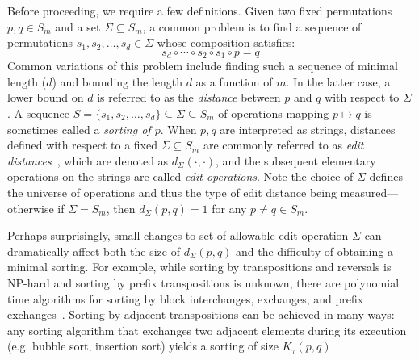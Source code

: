 \documentclass[sn-mathphys]{sn-jnl}
\begin{document}
Before proceeding, we require a few definitions. Given two fixed permutations $p, q \in S_m$ and a set $\Sigma \subseteq S_m$,  a common  problem is to find a sequence of permutations $s_1, s_2, \dots, s_d \in \Sigma$ whose composition satisfies:
	\begin{equation}\label{eq:sorting}
		s_d \circ \cdots \circ s_2 \circ s_1 \circ p = q
	\end{equation}
Common variations of this problem include finding such a sequence of minimal length ($d$) and bounding the length $d$ as a function of $m$. In the latter case, a lower bound on $d$ is referred to as the \emph{distance} between $p$ and $q$ with respect to $\Sigma$. 
A sequence $S = \{s_1, s_2, \dots, s_d\} \subseteq \Sigma \subseteq S_m$ of operations mapping $p \mapsto q$ is sometimes called a \emph{sorting of $p$}. 
When $p, q$ are interpreted as strings, distances defined with respect to a fixed $\Sigma \subseteq S_m$ are commonly referred to as \emph{edit distances}~\cite{bergroth2000survey}, which are denoted as $d_\Sigma(\cdot, \cdot)$, and the subsequent elementary operations on the strings are called \emph{edit operations}. 
Note the choice of $\Sigma$ defines the universe of operations and thus the type of edit distance being measured---otherwise if $\Sigma = S_m$, then $d_\Sigma(p, q) = 1$ for any $p\neq  q \in S_m$.

Perhaps surprisingly, small changes to set of allowable edit operation $\Sigma$ can dramatically affect both the size of $d_\Sigma(p,q)$ and the difficulty of obtaining a minimal sorting. 
For example, while sorting by transpositions and reversals is NP-hard and sorting by prefix  transpositions is unknown, there are polynomial time algorithms for sorting by block interchanges, exchanges, and prefix exchanges~\cite{labarre2013lower}. Sorting by adjacent transpositions can be achieved in many ways: any sorting algorithm that exchanges two adjacent elements during its execution (e.g. bubble sort, insertion sort) yields a sorting of size $K_\tau(p, q)$.  
\end{document}
